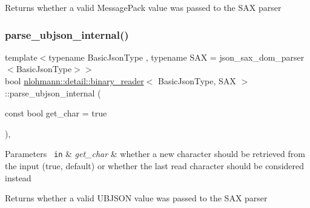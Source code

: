 \begin{DoxyReturn}{Returns}
whether a valid Message\+Pack value was passed to the S\+AX parser 
\end{DoxyReturn}
\mbox{\label{classnlohmann_1_1detail_1_1binary__reader_af60c6bba6f1301cb02e0186c99e25751}} 
\subsubsection{\texorpdfstring{parse\_ubjson\_internal()}{parse\_ubjson\_internal()}}
{\footnotesize\ttfamily template$<$typename Basic\+Json\+Type , typename S\+AX  = json\+\_\+sax\+\_\+dom\+\_\+parser$<$\+Basic\+Json\+Type$>$$>$ \\
bool \mbox{\hyperlink{classnlohmann_1_1detail_1_1binary__reader}{nlohmann\+::detail\+::binary\+\_\+reader}}$<$ Basic\+Json\+Type, S\+AX $>$\+::parse\+\_\+ubjson\+\_\+internal (\begin{DoxyParamCaption}\item[{const bool}]{get\+\_\+char = {\ttfamily true} }\end{DoxyParamCaption})\hspace{0.3cm}{\ttfamily [inline]}, {\ttfamily [private]}}


\begin{DoxyParams}[1]{Parameters}
\mbox{\texttt{ in}}  & {\em get\+\_\+char} & whether a new character should be retrieved from the input (true, default) or whether the last read character should be considered instead\\
\hline
\end{DoxyParams}
\begin{DoxyReturn}{Returns}
whether a valid U\+B\+J\+S\+ON value was passed to the S\+AX parser 
\end{DoxyReturn}
\mbox{\label{classnlohmann_1_1detail_1_1binary__reader_ab94a54d6e595c2620b07589cf4116256}} 
